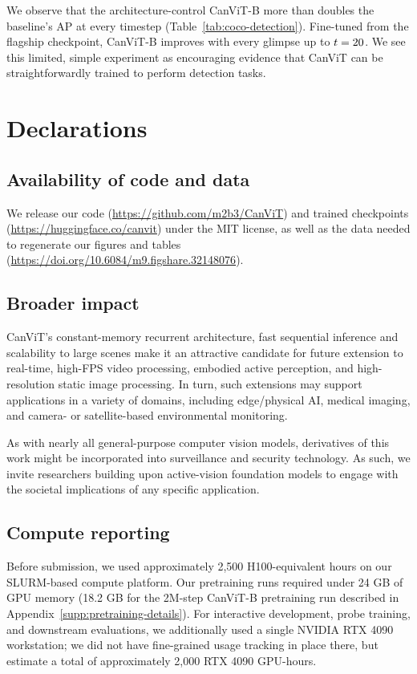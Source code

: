 \documentclass{article}
\begin{document}
We observe that the architecture-control CanViT-B more than doubles the baseline's AP at every timestep (Table~\ref{tab:coco-detection}).
Fine-tuned from the flagship checkpoint, CanViT-B improves with every glimpse up to $t = 20$.
We see this limited, simple experiment as encouraging evidence that CanViT can be straightforwardly trained to perform detection tasks.


\FloatBarrier
\section{Declarations}
\label{supp:declarations}

\subsection{Availability of code and data}
\label{supp:declarations:code-and-data}
We release our code (\url{https://github.com/m2b3/CanViT}) and trained checkpoints (\url{https://huggingface.co/canvit}) under the MIT license, as well as the data needed to regenerate our figures and tables (\url{https://doi.org/10.6084/m9.figshare.32148076}).

\subsection{Broader impact}
\label{supp:declarations:broader-impact}
CanViT's constant-memory recurrent architecture, fast sequential inference and scalability to large scenes make it an attractive candidate for future extension to real-time, high-FPS video processing, embodied active perception, and high-resolution static image processing. In turn, such extensions may support applications in a variety of domains, including edge/physical AI, medical imaging, and camera- or satellite-based environmental monitoring.

As with nearly all general-purpose computer vision models, derivatives of this work might be incorporated into surveillance and security technology. As such, we invite researchers building upon active-vision foundation models to engage with the societal implications of any specific application.

\subsection{Compute reporting}
\label{supp:declarations:compute-reporting}
Before submission, we used approximately 2{,}500 H100-equivalent hours on our SLURM-based compute platform. Our pretraining runs required under 24 GB of GPU memory (18.2 GB for the 2M-step CanViT-B pretraining run described in Appendix~\ref{supp:pretraining-details}). For interactive development, probe training, and downstream evaluations, we additionally used a single NVIDIA RTX 4090 workstation; we did not have fine-grained usage tracking in place there, but estimate a total of approximately 2{,}000 RTX 4090 GPU-hours.
\end{document}

